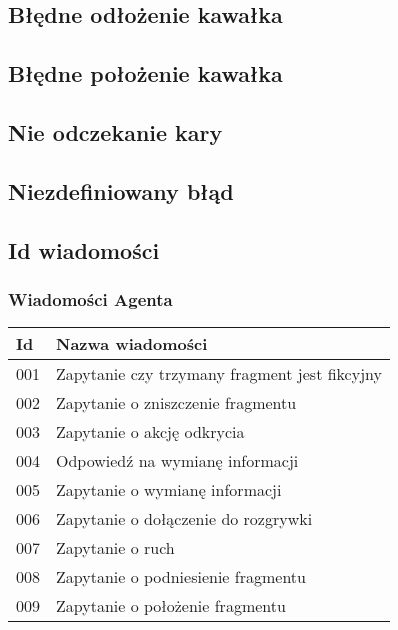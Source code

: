 \documentclass[Dokumentacja.tex]{subfiles}
\begin{document}
\subsection{Błędne odłożenie kawałka}


\subsection{Błędne położenie kawałka}


\subsection{Nie odczekanie kary}


\subsection{Niezdefiniowany błąd}


\subsection{Id wiadomości}

\subsubsection{Wiadomości Agenta}
\begin{tabular}{ |p{1cm}|p{12cm}| } 
 \hline
 Id & Nazwa wiadomości \\
 \hline
 001 & Zapytanie czy trzymany fragment jest fikcyjny \\ 
 002 & Zapytanie o zniszczenie fragmentu \\ 
 003 & Zapytanie o akcję odkrycia \\ 
 004 & Odpowiedź na wymianę informacji \\ 
 005 & Zapytanie o wymianę informacji \\ 
 006 & Zapytanie o dołączenie do rozgrywki \\ 
 007 & Zapytanie o ruch \\ 
 008 & Zapytanie o podniesienie fragmentu \\ 
 009 & Zapytanie o położenie fragmentu \\ 
 \hline
\end{tabular}
\end{document}
